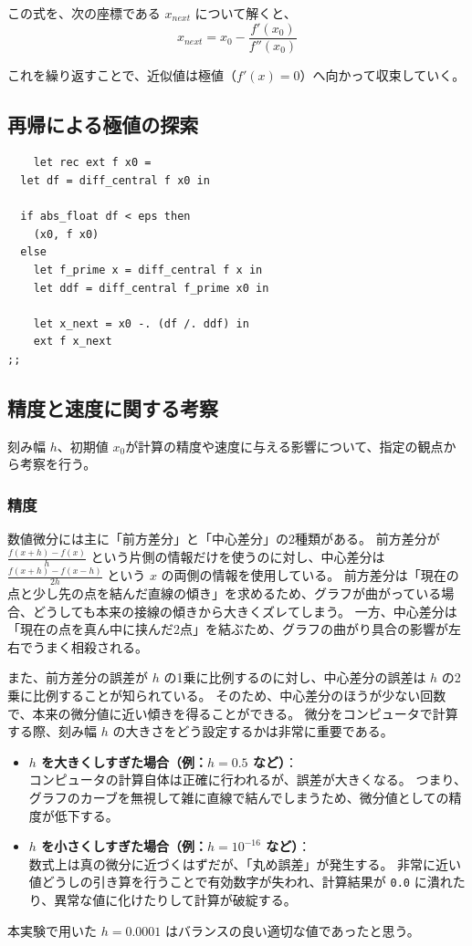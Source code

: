 \documentclass[titlepage]{ltjsarticle}
\begin{document}
この式を、次の座標である $x_{next}$ について解くと、
\begin{equation}
x_{next} = x_0 - \frac{f'(x_0)}{f''(x_0)}
\end{equation}

これを繰り返すことで、近似値は極値（$f'(x)=0$）へ向かって収束していく。

\clearpage

\subsection{再帰による極値の探索}
\begin{verbatim}
    let rec ext f x0 =
  let df = diff_central f x0 in
  
  if abs_float df < eps then
    (x0, f x0)
  else
    let f_prime x = diff_central f x in
    let ddf = diff_central f_prime x0 in
    
    let x_next = x0 -. (df /. ddf) in
    ext f x_next
;;
\end{verbatim}

\subsection{精度と速度に関する考察}
刻み幅 $h$、初期値 $x_0$が計算の精度や速度に与える影響について、指定の観点から考察を行う。
\subsubsection{精度}
数値微分には主に「前方差分」と「中心差分」の2種類がある。
前方差分が $\frac{f(x+h)-f(x)}{h}$ という片側の情報だけを使うのに対し、中心差分は $\frac{f(x+h)-f(x-h)}{2h}$ という $x$ の両側の情報を使用している。
前方差分は「現在の点と少し先の点を結んだ直線の傾き」を求めるため、グラフが曲がっている場合、どうしても本来の接線の傾きから大きくズレてしまう。
一方、中心差分は「現在の点を真ん中に挟んだ2点」を結ぶため、グラフの曲がり具合の影響が左右でうまく相殺される。
\par
また、前方差分の誤差が $h$ の1乗に比例するのに対し、中心差分の誤差は $h$ の2乗に比例することが知られている。
そのため、中心差分のほうが少ない回数で、本来の微分値に近い傾きを得ることができる。
微分をコンピュータで計算する際、刻み幅 $h$ の大きさをどう設定するかは非常に重要である。
\begin{itemize}
    \item \textbf{$h$ を大きくしすぎた場合（例：$h = 0.5$ など）}：\\
    コンピュータの計算自体は正確に行われるが、誤差が大きくなる。
    つまり、グラフのカーブを無視して雑に直線で結んでしまうため、微分値としての精度が低下する。
    \par
    \item \textbf{$h$ を小さくしすぎた場合（例：$h = 10^{-16}$ など）}：\\
    数式上は真の微分に近づくはずだが、「丸め誤差」が発生する。
    非常に近い値どうしの引き算を行うことで有効数字が失われ、計算結果が \texttt{0.0} に潰れたり、異常な値に化けたりして計算が破綻する。
\end{itemize}
本実験で用いた $h = 0.0001$ はバランスの良い適切な値であったと思う。
\end{document}
